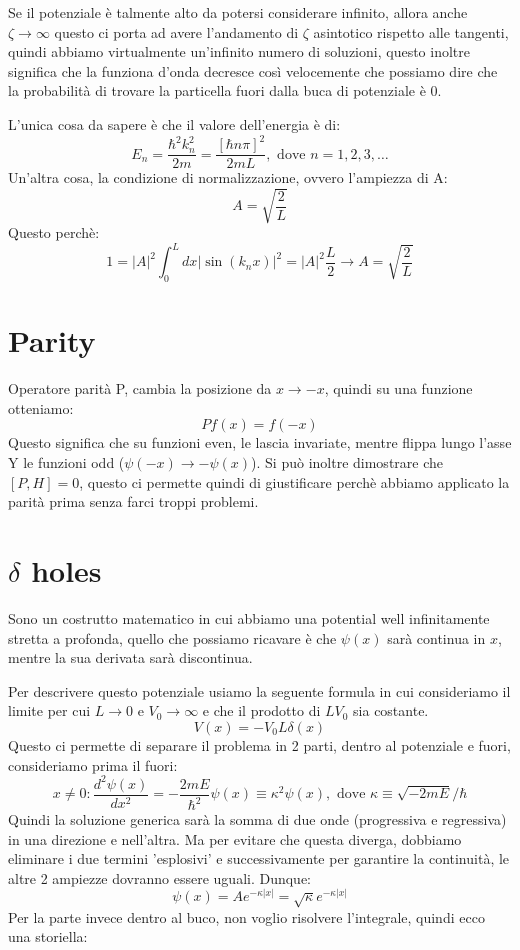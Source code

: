 Se il potenziale è talmente alto da potersi considerare infinito, allora anche $\zeta \rightarrow \infty$ questo ci porta ad avere l'andamento di $\zeta$ asintotico rispetto alle tangenti, quindi abbiamo virtualmente un'infinito numero di soluzioni, questo inoltre significa che la funziona d'onda decresce così velocemente che possiamo dire che la probabilità di trovare la particella fuori dalla buca di potenziale è 0.

L'unica cosa da sapere è che il valore dell'energia è di:
$$E_n = \frac{\hbar^2k_n^2}{2m} = \frac{[\hbar n\pi]^2}{2mL}, \text{ dove } n = 1, 2, 3, \dots$$ 
Un'altra cosa, la condizione di normalizzazione, ovvero l'ampiezza di A:
$$A=\sqrt{\frac{2}{L}}$$
Questo perchè:
$$1 = |A|^2\int_{0}^{L}dx|\sin(k_nx)|^2 = |A|^2\frac{L}{2} \longrightarrow A=\sqrt{\frac{2}{L}}$$

\section{Parity}

Operatore parità P, cambia la posizione da $x \rightarrow -x$, quindi su una funzione otteniamo:
$$Pf(x) = f(-x)$$
Questo significa che su funzioni even, le lascia invariate, mentre flippa lungo l'asse Y le funzioni odd ($\psi(-x) \rightarrow -\psi(x)$).
Si può inoltre dimostrare che $[P, H] = 0$, questo ci permette quindi di giustificare perchè abbiamo applicato la parità prima senza farci troppi problemi.

\section{$\delta$ holes}

Sono un costrutto matematico in cui abbiamo una potential well infinitamente stretta a profonda, quello che possiamo ricavare è che $\psi(x)$ sarà continua in $x$, mentre la sua derivata sarà discontinua.

Per descrivere questo potenziale usiamo la seguente formula in cui consideriamo il limite per cui $L\rightarrow 0$ e $V_0\rightarrow \infty$ e che il prodotto di $LV_0$ sia costante.
$$V(x) = -V_0L\delta(x)$$
Questo ci permette di separare il problema in 2 parti, dentro al potenziale e fuori, consideriamo prima il fuori:
$$x \neq 0: \frac{d^2\psi(x)}{dx^2}=-\frac{2mE}{\hbar^2}\psi(x)\equiv\kappa^2\psi(x), \text{ dove } \kappa \equiv \sqrt{-2mE}/\hbar$$
Quindi la soluzione generica sarà la somma di due onde (progressiva e regressiva) in una direzione e nell'altra. Ma per evitare che questa diverga, dobbiamo eliminare i due termini 'esplosivi' e successivamente per garantire la continuità, le altre 2 ampiezze dovranno essere uguali. Dunque:
$$\psi(x) = Ae^{-\kappa|x|} = \sqrt{\kappa}e^{-\kappa|x|}$$
Per la parte invece dentro al buco, non voglio risolvere l'integrale, quindi ecco una storiella:
